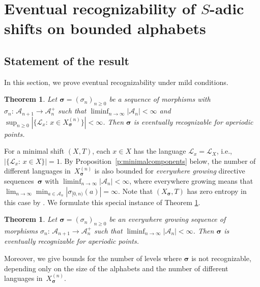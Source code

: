 \documentclass{amsart}
\newtheorem{theorem}[lemma]{Theorem}
\theoremstyle{definition}
\theoremstyle{remark}
\numberwithin{equation}{section}
\begin{document}
\section{Eventual recognizability of $S$-adic shifts on bounded alphabets} \label{main_S_adic-2}




\subsection{Statement of the result} 
In this section, we prove eventual recognizability under mild conditions. 

\begin{theorem} \label{t:evrec}
Let $\boldsymbol{\sigma} = (\sigma_n)_{n\ge0}$ be a sequence of morphisms with $\sigma_n:\, \mathcal{A}_{n+1}\to \mathcal{A}_n^+$ such that $\liminf_{n\to\infty} |\mathcal{A}_n| < \infty$ and $\sup_{n\ge0} |\{\mathcal{L}_x:\, x \in X_{\boldsymbol{\sigma}}^{(n)}\}| < \infty$. 
Then $\boldsymbol{\sigma}$ is eventually recognizable for aperiodic points. 
\end{theorem}

For a minimal shift $(X,T)$, each $x \in X$ has the language $\mathcal{L}_x = \mathcal{L}_X$, i.e., $|\{\mathcal{L}_x:\, x \in X\}| = 1$. 
By Proposition~\ref{p:minimalcomponents} below, the number of different languages in~$X_{\boldsymbol{\sigma}}^{(n)}$ is also bounded for \emph{everywhere growing} directive sequences~$\boldsymbol{\sigma}$ with $\liminf_{n\to\infty} |\mathcal{A}_n| < \infty$, where everywhere growing means that $\lim_{n\to \infty}\min_{a\in \mathcal{A}_n} |\sigma_{[0,n)}(a)| = \infty$.
Note that  $(X_{\boldsymbol{\sigma}},T)$ has zero entropy in this case by \cite[Theorem~4.3]{Berthe-Delecroix}. We  formulate this special instance of Theorem \ref{t:evrec}.

\begin{theorem} \label{t:evrec-1}
Let $\boldsymbol{\sigma} = (\sigma_n)_{n\ge0}$ be an everywhere growing  sequence of morphisms $\sigma_n:\, \mathcal{A}_{n+1}\to \mathcal{A}_n^+$ such that $\liminf_{n\to\infty} |\mathcal{A}_n| < \infty$.
Then $\boldsymbol{\sigma}$ is eventually recognizable for aperiodic points. 
\end{theorem}



Moreover, we give bounds for the number of levels where $\boldsymbol{\sigma}$ is not recognizable, depending only on the size of the alphabets and the number of different languages in~$X_{\boldsymbol{\sigma}}^{(n)}$.
\end{document}
